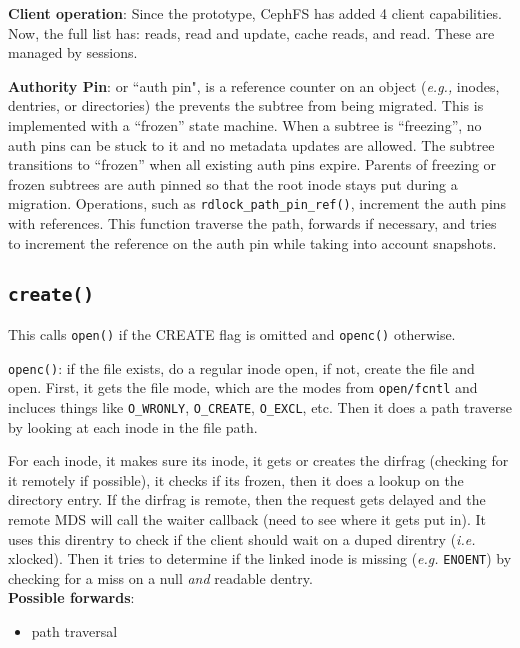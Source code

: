 \documentclass[conference]{acm_proc_article-sp} \usepackage[english]{babel}
\begin{document}
\textbf{Client operation}: Since the prototype, CephFS has added 4 client
capabilities. Now, the full list has: reads, read and update, cache reads, and
read. These are managed by sessions. 

\textbf{Authority Pin}: or ``auth pin", is a reference counter on an object
({\it e.g.,} inodes, dentries, or directories) the prevents the subtree from
being migrated. This is implemented with a ``frozen'' state machine. When a
subtree is ``freezing'', no auth pins can be stuck to it and no metadata
updates are allowed. The subtree transitions to ``frozen'' when all existing
auth pins expire. Parents of freezing or frozen subtrees are auth pinned so
that the root inode stays put during a migration. Operations, such as
\texttt{rdlock\_path\_pin\_ref()}, increment the auth pins with references.
This function traverse the path, forwards if necessary, and tries to increment
the reference on the auth pin while taking into account snapshots.


\subsection{\texttt{create()}}

This calls \texttt{open()} if the CREATE flag is omitted and  \texttt{openc()}
otherwise.

\texttt{openc()}: if the file exists, do a regular inode open, if not, create
the file and open. First, it gets the file mode, which are the modes from
\texttt{open/fcntl} and incluces things like \texttt{O\_WRONLY},
\texttt{O\_CREATE}, \texttt{O\_EXCL}, etc. Then it does a path traverse by
looking at each inode in the file path. 

For each inode, it makes sure its inode, it gets or creates the dirfrag
(checking for it remotely if possible), it checks if its frozen, then it does a
lookup on the directory entry. If the dirfrag is remote, then the request gets
delayed and the remote MDS will call the waiter callback (need to see where it
gets put in). It uses this direntry to check if the client should wait on a
duped direntry ({\it i.e.} xlocked). Then it tries to determine if the linked
inode is missing ({\it e.g.} \texttt{ENOENT}) by checking for a miss on a null
{\it and} readable dentry.\\

\noindent\textbf{Possible forwards}: 

\begin{itemize} \item path traversal \end{itemize}
\end{document}
